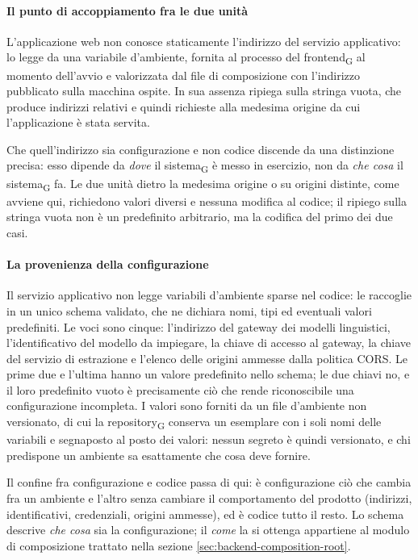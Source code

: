 \documentclass[a4paper, 10pt]{article}
\begin{document}
\paragraph{Il punto di accoppiamento fra le due unità}
L'applicazione web non conosce staticamente l'indirizzo del servizio applicativo: lo legge da una variabile d'ambiente, fornita al processo del frontend\textsubscript{G} al momento dell'avvio e valorizzata dal file di composizione con l'indirizzo pubblicato sulla macchina ospite. In sua assenza ripiega sulla stringa vuota, che produce indirizzi relativi e quindi richieste alla medesima origine da cui l'applicazione è stata servita.

Che quell'indirizzo sia configurazione e non codice discende da una distinzione precisa: esso dipende da \textit{dove} il sistema\textsubscript{G} è messo in esercizio, non da \textit{che cosa} il sistema\textsubscript{G} fa. Le due unità dietro la medesima origine o su origini distinte, come avviene qui, richiedono valori diversi e nessuna modifica al codice; il ripiego sulla stringa vuota non è un predefinito arbitrario, ma la codifica del primo dei due casi.

\paragraph{La provenienza della configurazione}
Il servizio applicativo non legge variabili d'ambiente sparse nel codice: le raccoglie in un unico schema validato, che ne dichiara nomi, tipi ed eventuali valori predefiniti. Le voci sono cinque: l'indirizzo del gateway dei modelli linguistici, l'identificativo del modello da impiegare, la chiave di accesso al gateway, la chiave del servizio di estrazione e l'elenco delle origini ammesse dalla politica CORS. Le prime due e l'ultima hanno un valore predefinito nello schema; le due chiavi no, e il loro predefinito vuoto è precisamente ciò che rende riconoscibile una configurazione incompleta. I valori sono forniti da un file d'ambiente non versionato, di cui la repository\textsubscript{G} conserva un esemplare con i soli nomi delle variabili e segnaposto al posto dei valori: nessun segreto è quindi versionato, e chi predispone un ambiente sa esattamente che cosa deve fornire.

Il confine fra configurazione e codice passa di qui: è configurazione ciò che cambia fra un ambiente e l'altro senza cambiare il comportamento del prodotto (indirizzi, identificativi, credenziali, origini ammesse), ed è codice tutto il resto. Lo schema descrive \textit{che cosa} sia la configurazione; il \textit{come} la si ottenga appartiene al modulo di composizione trattato nella sezione \ref{sec:backend-composition-root}.
\end{document}
